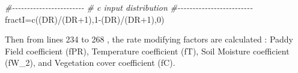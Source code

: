 \documentclass[
  10pt,
  b5paper,
]{book}
\newenvironment{Shaded}{\begin{snugshade}}{\end{snugshade}}
\newcommand{\CommentTok}[1]{\textcolor[rgb]{0.56,0.35,0.01}{\textit{#1}}}
\newcommand{\DecValTok}[1]{\textcolor[rgb]{0.00,0.00,0.81}{#1}}
\newcommand{\FunctionTok}[1]{\textcolor[rgb]{0.00,0.00,0.00}{#1}}
\newcommand{\NormalTok}[1]{#1}
\newcommand{\OtherTok}[1]{\textcolor[rgb]{0.56,0.35,0.01}{#1}}
\newcommand{\SpecialCharTok}[1]{\textcolor[rgb]{0.00,0.00,0.00}{#1}}
\begin{document}
\begin{Shaded}
\begin{Highlighting}[]
  \CommentTok{\#{-}{-}{-}{-}{-}{-}{-}{-}{-}{-}{-}{-}{-}{-}{-}{-}{-}{-}{-}{-}{-}{-}{-}{-}}
  \CommentTok{\# c input distribution}
  \CommentTok{\#{-}{-}{-}{-}{-}{-}{-}{-}{-}{-}{-}{-}{-}{-}{-}{-}{-}{-}{-}{-}{-}{-}{-}{-}{-}}
\NormalTok{  fractI}\OtherTok{=}\FunctionTok{c}\NormalTok{((DR)}\SpecialCharTok{/}\NormalTok{(DR}\SpecialCharTok{+}\DecValTok{1}\NormalTok{),}\DecValTok{1}\SpecialCharTok{{-}}\NormalTok{(DR)}\SpecialCharTok{/}\NormalTok{(DR}\SpecialCharTok{+}\DecValTok{1}\NormalTok{),}\DecValTok{0}\NormalTok{)}
\end{Highlighting}
\end{Shaded}

Then from lines 234 to 268 , the rate modifying factors are calculated : Paddy Field coefficient (fPR), Temperature coefficient (fT), Soil Moisture coefficient (fW\_2), and Vegetation cover coefficient (fC).
\end{document}
